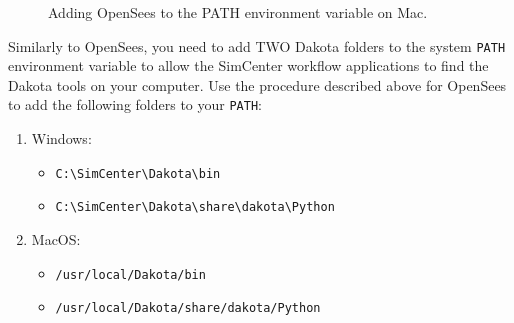 \begin{figure}[!htbp]
  \caption{Adding OpenSees to the PATH environment variable on Mac.}
  \label{fig:dakota_installation}
\end{figure}

Similarly to OpenSees, you need to add TWO Dakota folders to the system \texttt{PATH} environment variable to allow the SimCenter workflow applications to find the Dakota tools on your computer. Use the procedure described above for OpenSees to add the following folders to your \texttt{PATH}:

\begin{enumerate}
\item Windows:
\begin{itemize}
    \item \texttt{C:\textbackslash SimCenter\textbackslash Dakota\textbackslash bin}
    \item \texttt{C:\textbackslash SimCenter\textbackslash Dakota\textbackslash share\textbackslash dakota\textbackslash Python}
\end{itemize}

\item MacOS:
\begin{itemize}
    \item \texttt{/usr/local/Dakota/bin}
    \item \texttt{/usr/local/Dakota/share/dakota/Python}
\end{itemize}
\end{enumerate}
